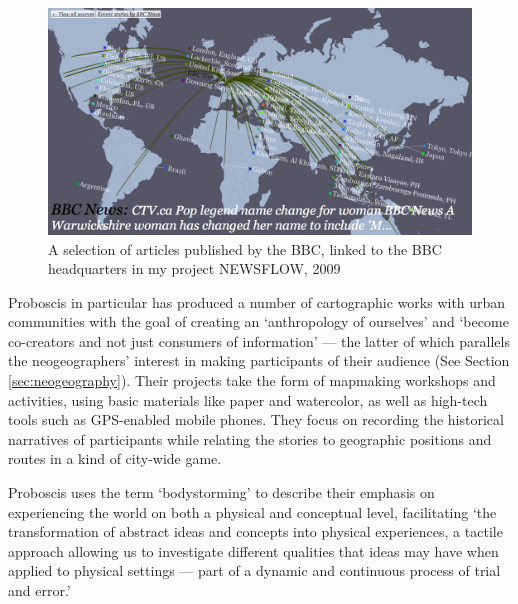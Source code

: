 \documentclass[11pt,oneside,notitlepage]{report}
\begin{document}
{{\begin{figure}[h]
	\begin{center}
		\includegraphics[width=1\textwidth]{images/newsflow.png}
		\caption{A selection of articles published by the BBC, linked to the BBC headquarters in my project NEWSFLOW, 2009}
	\end{center}
\end{figure}

Proboscis in particular has produced a number of cartographic works with urban communities with the goal of creating an `anthropology of ourselves' and `become co-creators and not just consumers of information' --- the latter of which parallels the neogeographers' interest in making participants of their audience (See Section \ref{sec:neogeography}). Their projects take the form of mapmaking workshops and activities, using basic materials like paper and watercolor, as well as high-tech tools such as GPS-enabled mobile phones. They focus on recording the historical narratives of participants while relating the stories to geographic positions and routes in a kind of city-wide game. 

Proboscis uses the term `bodystorming' to describe their emphasis on experiencing the world on both a physical and conceptual level, facilitating `the transformation of abstract ideas and concepts into physical experiences, a tactile approach allowing us to investigate different qualities that ideas may have when applied to physical settings --- part of a dynamic and continuous process of trial and error.' \cite{proboscis2003bodystorming} 

}}
\end{document}
